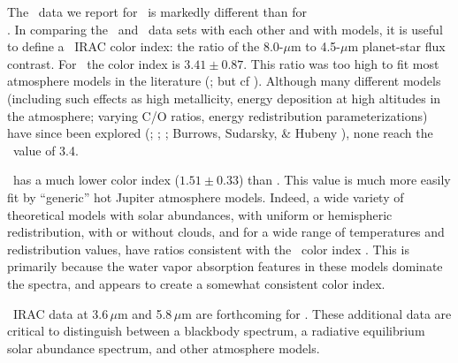 The \spi\ data we report for \tresTwo\ is markedly different than for \tresOne\ \\ \citep{Charbonneau_Allen_Megeath:apj:2005a}.
In comparing the \tresTwo\ and \tresOne\ data sets with each other and with models, it is useful to define a \spi\ IRAC color index: the ratio of the 8.0-$\mu$m to 4.5-$\mu$m planet-star flux contrast.
For \tresOne\ the color index is \mbox{$3.41 \pm 0.87$}.
This ratio was too high to fit most atmosphere models in the literature (\citealp[see][]{Fortney_Marley_Lodders:apjl:2005a, Seager_Richardson_Hansen:apj:2005a, Barman_Hauschildt_Allard:apj:2005a};  but cf \citealt*{Burrows_Sudarsky_Hubeny:apj:2006a}).%
Although many different models (including such effects as high metallicity, energy deposition at high altitudes in the atmosphere; varying C/O ratios, energy redistribution parameterizations) have since been explored (\citealp{Barman_Hauschildt_Allard:apj:2005a}; \citealp{Fortney_Marley_Lodders:apjl:2005a}; \citealp{Seager_Richardson_Hansen:apj:2005a};  Burrows, Sudarsky, \& Hubeny \citeyear{Burrows_Sudarsky_Hubeny:apj:2006a}), none reach the \tresOne\ value of 3.4.

\tresTwo\ has a much lower color index (\mbox{$1.51 \pm 0.33$}) than \tresOne.
This value is much more easily fit by ``generic'' hot Jupiter atmosphere models.
Indeed, a wide variety of theoretical models with solar abundances, with uniform or hemispheric redistribution, with or without clouds, and for a wide range of temperatures and redistribution values, have ratios consistent with the \tresTwo\ color index \citep[see, e.g.,][]{Fortney_Marley_Lodders:apjl:2005a, Barman_Hauschildt_Allard:apj:2005a, Charbonneau_Allen_Megeath:apj:2005a}.
This is primarily because the water vapor absorption features in these models dominate the spectra, and appears to create a somewhat consistent color index.

\spi\ IRAC data at 3.6\,$\mu$m and 5.8\,$\mu$m are forthcoming for \tresTwo.
These additional data are critical to distinguish between a blackbody spectrum, a radiative equilibrium solar abundance spectrum, and other atmosphere models.%
